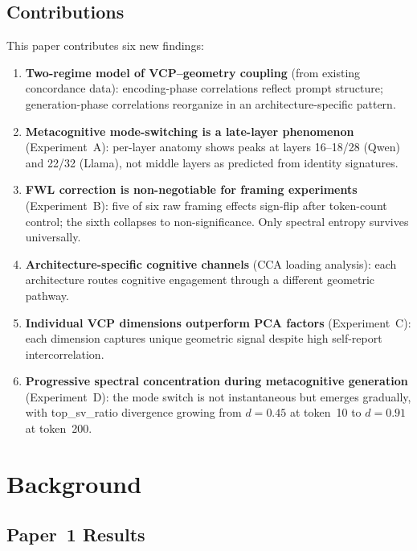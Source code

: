 \documentclass[11pt,a4paper]{article}
\begin{document}
\subsection{Contributions}

This paper contributes six new findings:

\begin{enumerate}
    \item \textbf{Two-regime model of VCP--geometry coupling} (from existing concordance data): encoding-phase correlations reflect prompt structure; generation-phase correlations reorganize in an architecture-specific pattern.

    \item \textbf{Metacognitive mode-switching is a late-layer phenomenon} (Experiment~A): per-layer anatomy shows peaks at layers 16--18/28 (Qwen) and 22/32 (Llama), not middle layers as predicted from identity signatures.

    \item \textbf{FWL correction is non-negotiable for framing experiments} (Experiment~B): five of six raw framing effects sign-flip after token-count control; the sixth collapses to non-significance. Only spectral entropy survives universally.

    \item \textbf{Architecture-specific cognitive channels} (CCA loading analysis): each architecture routes cognitive engagement through a different geometric pathway.

    \item \textbf{Individual VCP dimensions outperform PCA factors} (Experiment~C): each dimension captures unique geometric signal despite high self-report intercorrelation.

    \item \textbf{Progressive spectral concentration during metacognitive generation} (Experiment~D): the mode switch is not instantaneous but emerges gradually, with top\_sv\_ratio divergence growing from $d = 0.45$ at token~10 to $d = 0.91$ at token~200.
\end{enumerate}

\section{Background}

\subsection{Paper~1 Results}
\end{document}
